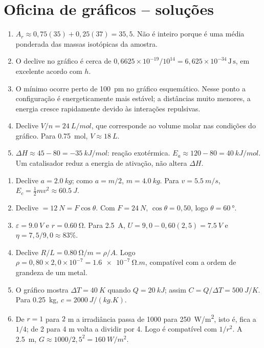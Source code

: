 \documentclass[11pt,a4paper,oneside]{book}
\begin{document}
\section*{Oficina de gráficos -- soluções}
\begin{enumerate}[label=\textbf{QG\arabic*.},leftmargin=*]
\item $A_r\approx0{,}75(35)+0{,}25(37)=35{,}5$. Não é inteiro porque é uma média ponderada das massas isotópicas da amostra.
\item O declive no gráfico é cerca de $0{,}6625\times10^{-19}/10^{14}=6{,}625\times10^{-34}\,\mathrm{J\,s}$, em excelente acordo com $h$.
\item O mínimo ocorre perto de \SI{100}{pm} no gráfico esquemático. Nesse ponto a configuração é energeticamente mais estável; a distâncias muito menores, a energia cresce rapidamente devido às interações repulsivas.
\item Declive $V/n=\SI{24}{L/mol}$, que corresponde ao volume molar nas condições do gráfico. Para \SI{0.75}{mol}, $V\approx\SI{18}{L}$.
\item $\Delta H\approx45-80=\SI{-35}{kJ/mol}$: reação exotérmica. $E_a\approx120-80=\SI{40}{kJ/mol}$. Um catalisador reduz a energia de ativação, não altera $\Delta H$.
\end{enumerate}

\begin{enumerate}[label=\textbf{FG\arabic*.},leftmargin=*]
\item Declive $a=\SI{2.0}{kg}$; como $a=m/2$, $m=\SI{4.0}{kg}$. Para $v=\SI{5.5}{m/s}$, $E_c=\frac12mv^2\approx\SI{60.5}{J}$.
\item Declive $=\SI{12}{N}=F\cos\theta$. Com $F=\SI{24}{N}$, $\cos\theta=0{,}50$, logo $\theta=\SI{60}{\degree}$.
\item $\varepsilon=\SI{9.0}{V}$ e $r=\SI{0.60}{\ohm}$. Para \SI{2.5}{A}, $U=9{,}0-0{,}60(2{,}5)=\SI{7.5}{V}$ e $\eta=7{,}5/9{,}0\approx83\%$.
\item Declive $R/L=\SI{0.80}{\ohm/m}=\rho/A$. Logo $\rho=0{,}80\times2{,}0\times10^{-7}=\SI{1.6e-7}{\ohm.m}$, compatível com a ordem de grandeza de um metal.
\item O gráfico mostra $\Delta T=\SI{40}{K}$ quando $Q=\SI{20}{kJ}$; assim $C=Q/\Delta T=\SI{500}{J/K}$. Para \SI{0.25}{kg}, $c=\SI{2000}{J/(kg.K)}$.
\item De $r=1$ para $2$ m a irradiância passa de 1000 para \SI{250}{W/m^2}, isto é, fica a $1/4$; de 2 para 4 m volta a dividir por 4. Logo é compatível com $1/r^2$. A \SI{2.5}{m}, $G\approx1000/2{,}5^2=\SI{160}{W/m^2}$.
\end{enumerate}
\end{document}
